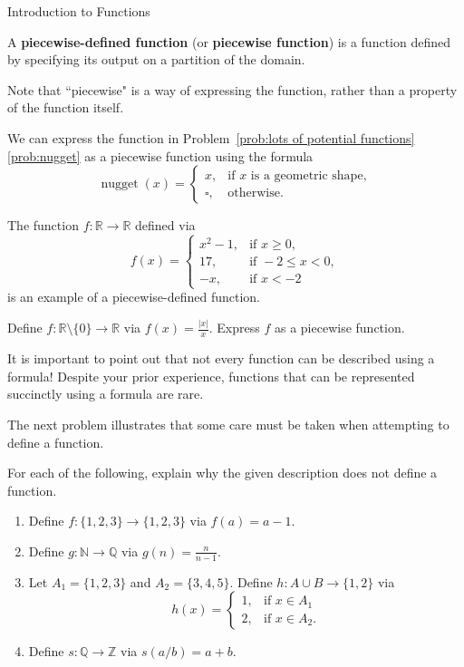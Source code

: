 \begin{section}{Introduction to Functions}
\begin{definition}
A \textbf{piecewise-defined function} (or \textbf{piecewise function}) is a function defined by specifying its output on a partition of the domain.
\end{definition}

Note that ``piecewise" is a way of expressing the function, rather than a property of the function itself.

\begin{example}
We can express the function in Problem~\ref{prob:lots of potential functions}\ref{prob:nugget} as a piecewise function using the formula
\[
\operatorname{nugget}(x)=\begin{cases}
x, & \mbox{if } x\mbox{ is a geometric shape},\\
\square, & \mbox{otherwise}.
\end{cases}
\]
\end{example}

\begin{example}
The function $f:\mathbb{R}\to \mathbb{R}$ defined via
\[
f(x)=\begin{cases}
x^2-1, & \mbox{if } x\geq 0,\\
17, & \mbox{if } -2\leq x< 0,\\
-x, & \mbox{if } x<-2
\end{cases}
\]
is an example of a piecewise-defined function.
\end{example}

\begin{problem}
Define $f:\mathbb{R}\setminus\{0\}\to \mathbb{R}$ via $f(x)=\frac{|x|}{x}$. Express $f$ as a piecewise function.
\end{problem}

It is important to point out that not every function can be described using a formula! Despite your prior experience, functions that can be represented succinctly using a formula are rare.

The next problem illustrates that some care must be taken when attempting to define a function.

\begin{problem}\label{prob:not well defined}
For each of the following, explain why the given description does not define a function.
\begin{enumerate}[label=\textrm{(\alph*)}]
\item Define $f:\{1,2,3\}\to \{1,2,3\}$ via $f(a)=a-1$.
\item Define $g:\mathbb{N}\to \mathbb{Q}$ via $g(n)=\frac{n}{n-1}$.
\item Let $A_1=\{1,2,3\}$ and $A_2=\{3,4,5\}$. Define $h:A\cup B\to \{1,2\}$ via
\[
h(x)=\begin{cases}
1, & \mbox{if }x\in A_1\\
2, & \mbox{if }x\in A_2.
\end{cases}
\]
\item Define $s:\mathbb{Q}\to \mathbb{Z}$ via $s(a/b)=a+b$.
\end{enumerate}
\end{problem}


\end{section}

